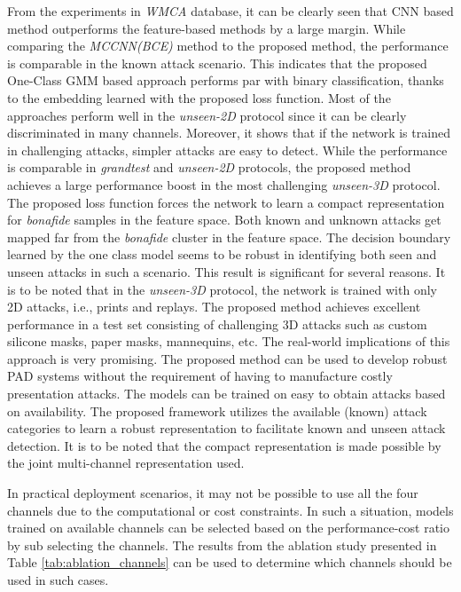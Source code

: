 \documentclass[journal]{IEEEtran}
\begin{document}
From the experiments in \textit{WMCA} database, it can be clearly seen that CNN based method outperforms the feature-based methods by a large margin. While comparing the \textit{MCCNN(BCE)} method to the proposed method, the performance is comparable in the known attack scenario. This indicates that the proposed One-Class GMM based approach performs par with binary classification, thanks to the embedding learned with the proposed loss function. Most of the approaches perform well in the \textit{unseen-2D} protocol since it can be clearly discriminated in many channels. Moreover, it shows that if the network is trained in challenging attacks, simpler attacks are easy to detect. While the performance is comparable in \textit{grandtest} and  \textit{unseen-2D} protocols, the proposed method achieves a large performance boost in the most challenging \textit{unseen-3D} protocol. The proposed loss function forces the network to learn a compact representation for \textit{bonafide} samples in the feature space. Both known and unknown attacks get mapped far from the \textit{bonafide} cluster in the feature space. The decision boundary learned by the one class model seems to be robust in identifying both seen and unseen attacks in such a scenario. This result is significant for several reasons. It is to be noted that in the \textit{unseen-3D} protocol, the network is trained with only 2D attacks, i.e., prints and replays. The proposed method achieves excellent performance in a test set consisting of challenging 3D attacks such as custom silicone masks, paper masks, mannequins, etc. The real-world implications of this approach is very promising. The proposed method can be used to develop robust PAD systems without the requirement of having to manufacture costly presentation attacks. The models can be trained on easy to obtain attacks based on availability. The proposed framework utilizes the available (known) attack categories to learn a robust representation to facilitate known and unseen attack detection. It is to be noted that the compact representation is made possible by the joint multi-channel representation used.

In practical deployment scenarios, it may not be possible to use all the four channels due to the computational or cost constraints. In such a situation, models trained on available channels can be selected based on the performance-cost ratio by sub selecting the channels. The results from the ablation study presented in Table \ref{tab:ablation_channels} can be used to determine which channels should be used in such cases.
\end{document}
